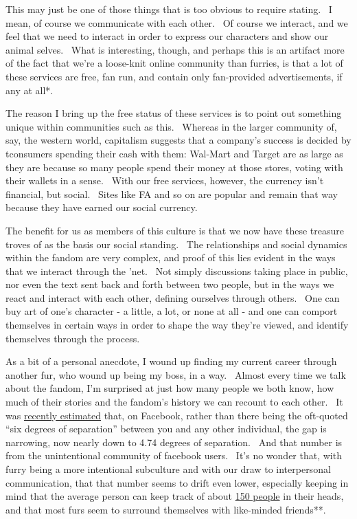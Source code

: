 This may just be one of those things that is too obvious to require
stating. ~I mean, of course we communicate with each other. ~Of course
we interact, and we feel that we need to interact in order to express
our characters and show our animal selves. ~What is interesting, though,
and perhaps this is an artifact more of the fact that we're a loose-knit
online community than furries, is that a lot of these services are free,
fan run, and contain only fan-provided advertisements, if any at all*.

The reason I bring up the free status of these services is to point out
something unique within communities such as this. ~Whereas in the larger
community of, say, the western world, capitalism suggests that a
company's success is decided by tconsumers spending their cash with
them: Wal-Mart and Target are as large as they are because so many
people spend their money at those stores, voting with their wallets in a
sense. ~With our free services, however, the currency isn't financial,
but social. ~Sites like FA and so on are popular and remain that way
because they have earned our social currency.

The benefit for us as members of this culture is that we now have these
treasure troves of as the basis our social standing. ~The relationships
and social dynamics within the fandom are very complex, and proof of
this lies evident in the ways that we interact through the 'net. ~Not
simply discussions taking place in public, nor even the text sent back
and forth between two people, but in the ways we react and interact with
each other, defining ourselves through others. ~One can buy art of one's
character - a little, a lot, or none at all - and one can comport
themselves in certain ways in order to shape the way they're viewed, and
identify themselves through the process.

As a bit of a personal anecdote, I wound up finding my current career
through another fur, who wound up being my boss, in a way. ~Almost every
time we talk about the fandom, I'm surprised at just how many people we
both know, how much of their stories and the fandom's history we can
recount to each other. ~It was
\href{http://flowingdata.com/2011/11/30/four-degrees-of-separation/}{recently
estimated} that, on Facebook, rather than there being the oft-quoted
``six degrees of separation'' between you and any other individual, the
gap is narrowing, now nearly down to 4.74 degrees of separation. ~And
that number is from the unintentional community of facebook users. ~It's
no wonder that, with furry being a more intentional subculture and with
our draw to interpersonal communication, that that number seems to drift
even lower, especially keeping in mind that the average person can keep
track of about
\href{http://www.cracked.com/article_14990_what-monkeysphere.html}{150
people} in their heads, and that most furs seem to surround themselves
with like-minded friends**.

